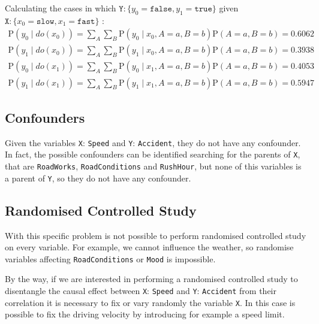\documentclass[a4paper,12pt]{article} %
\begin{document}
\noindent Calculating the cases in which $\mathtt{Y}: \{ y_0=\mathtt{false}, y_1=\mathtt{true}\}$ given $\mathtt{X}: \{ x_0=\mathtt{slow}, x_1=\mathtt{fast}\}$ :
\begin{equation*}
\begin{aligned}
\text{P}(y_0 \mid {do}(x_0)) = \sum_{A}^{}\sum_{B}^{}	\text{P}(y_0 \mid x_0, A = a, B = b)\text{P}(A = a, B = b)  = 0.6062	
\\
\text{P}(y_1 \mid {do}(x_0)) = \sum_{A}^{}\sum_{B}^{}	\text{P}(y_1 \mid x_0, A = a, B = b)\text{P}(A = a, B = b) = 0.3938
\\
\text{P}(y_0 \mid {do}(x_1)) = \sum_{A}^{}\sum_{B}^{}	\text{P}(y_0 \mid x_1, A = a, B = b)\text{P}(A = a, B = b) =  0.4053	
\\
\text{P}(y_1 \mid {do}(x_1)) = \sum_{A}^{}\sum_{B}^{}	\text{P}(y_1 \mid x_1, A = a, B = b)\text{P}(A = a, B = b) =  0.5947
\end{aligned}
\end{equation*}

\subsection*{Confounders}
Given the variables \texttt{X}: \texttt{Speed} and \texttt{Y}: \texttt{Accident}, they do not have any confounder. In fact, the possible confounders can be identified searching for the parents of \texttt{X}, that are \texttt{RoadWorks}, \texttt{RoadConditions} and \texttt{RushHour}, but none of this variables is a parent of \texttt{Y}, so they do not have any confounder.

\subsection*{Randomised Controlled Study}
With this specific problem is not possible to perform randomised controlled study on every variable. For example, we cannot influence the weather, so randomise variables affecting \texttt{RoadConditions} or \texttt{Mood} is impossible.

By the way, if we are interested in performing a randomised controlled study to disentangle the causal effect between \texttt{X}: \texttt{Speed} and \texttt{Y}: \texttt{Accident} from their correlation it is necessary to fix or vary randomly the variable \texttt{X}. In this case is possible to fix the driving velocity by introducing for example a speed limit.
\end{document}
